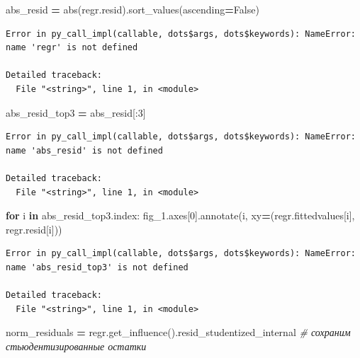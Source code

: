 \documentclass[]{book}
\newenvironment{Shaded}{\begin{snugshade}}{\end{snugshade}}
\newcommand{\BuiltInTok}[1]{#1}
\newcommand{\CommentTok}[1]{\textcolor[rgb]{0.56,0.35,0.01}{\textit{#1}}}
\newcommand{\ControlFlowTok}[1]{\textcolor[rgb]{0.13,0.29,0.53}{\textbf{#1}}}
\newcommand{\DecValTok}[1]{\textcolor[rgb]{0.00,0.00,0.81}{#1}}
\newcommand{\KeywordTok}[1]{\textcolor[rgb]{0.13,0.29,0.53}{\textbf{#1}}}
\newcommand{\NormalTok}[1]{#1}
\newcommand{\OperatorTok}[1]{\textcolor[rgb]{0.81,0.36,0.00}{\textbf{#1}}}
\newcommand{\VariableTok}[1]{\textcolor[rgb]{0.00,0.00,0.00}{#1}}
\begin{document}
\begin{Shaded}
\begin{Highlighting}[]
\NormalTok{abs_resid }\OperatorTok{=} \BuiltInTok{abs}\NormalTok{(regr.resid).sort_values(ascending}\OperatorTok{=}\VariableTok{False}\NormalTok{)}
\end{Highlighting}
\end{Shaded}

\begin{verbatim}
Error in py_call_impl(callable, dots$args, dots$keywords): NameError: name 'regr' is not defined

Detailed traceback: 
  File "<string>", line 1, in <module>
\end{verbatim}

\begin{Shaded}
\begin{Highlighting}[]
\NormalTok{abs_resid_top3 }\OperatorTok{=}\NormalTok{ abs_resid[:}\DecValTok{3}\NormalTok{]}
\end{Highlighting}
\end{Shaded}

\begin{verbatim}
Error in py_call_impl(callable, dots$args, dots$keywords): NameError: name 'abs_resid' is not defined

Detailed traceback: 
  File "<string>", line 1, in <module>
\end{verbatim}

\begin{Shaded}
\begin{Highlighting}[]
\ControlFlowTok{for}\NormalTok{ i }\KeywordTok{in}\NormalTok{ abs_resid_top3.index:}
\NormalTok{    fig_1.axes[}\DecValTok{0}\NormalTok{].annotate(i, }
\NormalTok{                               xy}\OperatorTok{=}\NormalTok{(regr.fittedvalues[i], }
\NormalTok{                                   regr.resid[i]))}
\end{Highlighting}
\end{Shaded}

\begin{verbatim}
Error in py_call_impl(callable, dots$args, dots$keywords): NameError: name 'abs_resid_top3' is not defined

Detailed traceback: 
  File "<string>", line 1, in <module>
\end{verbatim}

\begin{Shaded}
\begin{Highlighting}[]
\NormalTok{norm_residuals }\OperatorTok{=}\NormalTok{ regr.get_influence().resid_studentized_internal }\CommentTok{# сохраним стьюдентизированные остатки }
\end{Highlighting}
\end{Shaded}
\end{document}
